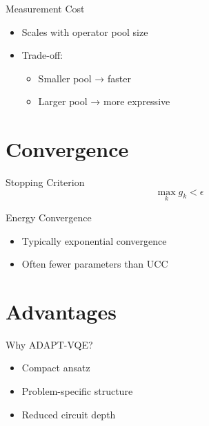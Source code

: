 \documentclass{beamer}
\begin{document}

\begin{frame}{Measurement Cost}
\begin{itemize}
\item Scales with operator pool size
\item Trade-off:
\begin{itemize}
\item Smaller pool → faster
\item Larger pool → more expressive
\end{itemize}
\end{itemize}
\end{frame}

\section{Convergence}

\begin{frame}{Stopping Criterion}
\[
\max_k g_k < \epsilon
\]
\end{frame}


\begin{frame}{Energy Convergence}
\begin{itemize}
\item Typically exponential convergence
\item Often fewer parameters than UCC
\end{itemize}
\end{frame}

\section{Advantages}

\begin{frame}{Why ADAPT-VQE?}
\begin{itemize}
\item Compact ansatz
\item Problem-specific structure
\item Reduced circuit depth
\end{itemize}
\end{frame}

\end{document}
